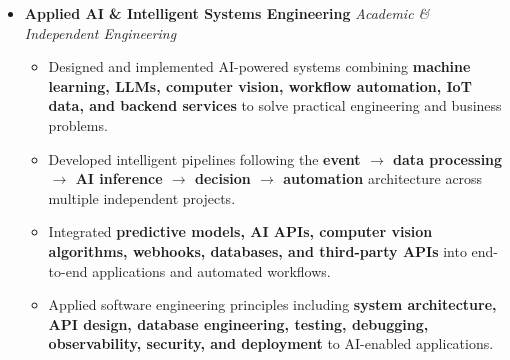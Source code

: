 \documentclass[a4paper,11pt]{article}
\newcommand{\resumeItem}[1]{
    \item \small{#1 \vspace{-2pt}}
}
\begin{document}
\begin{itemize}[leftmargin=0in, label={}]
\begin{itemize}[leftmargin=*]

\resumeItem{Selected for the \textbf{National Internship Program 2026 with SmartBridge}, gaining hands-on experience with enterprise application development and workflow automation using the \textbf{Pega Platform}.}

\resumeItem{Developing practical knowledge of \textbf{Business Process Management (BPM), Case Management, Digital Process Automation (DPA), workflow orchestration, and low-code application development}.}

\resumeItem{Applying structured enterprise development practices involving \textbf{business process modeling, case lifecycle management, application configuration, data integration, and automated business workflows}.}

\end{itemize}

\vspace{4pt}

\item
\textbf{Applied AI \& Intelligent Systems Engineering}
\hfill \textit{Academic \& Independent Engineering}

\begin{itemize}[leftmargin=*]

\resumeItem{Designed and implemented AI-powered systems combining \textbf{machine learning, LLMs, computer vision, workflow automation, IoT data, and backend services} to solve practical engineering and business problems.}

\resumeItem{Developed intelligent pipelines following the \textbf{event $\rightarrow$ data processing $\rightarrow$ AI inference $\rightarrow$ decision $\rightarrow$ automation} architecture across multiple independent projects.}

\resumeItem{Integrated \textbf{predictive models, AI APIs, computer vision algorithms, webhooks, databases, and third-party APIs} into end-to-end applications and automated workflows.}

\resumeItem{Applied software engineering principles including \textbf{system architecture, API design, database engineering, testing, debugging, observability, security, and deployment} to AI-enabled applications.}

\end{itemize}

\end{itemize}

\vspace{-10pt}
\end{document}
